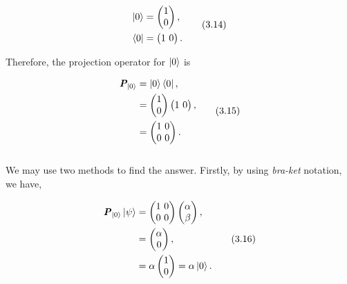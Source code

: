 \documentclass{article}
\begin{document}
\begin{align} \label{eq 3.14}
    \begin{split}
        \ket{0} &= \begin{pmatrix}
            1 \\ 0
        \end{pmatrix},\\
        \bra{0} &= \begin{pmatrix}
            1 \ 0\\
        \end{pmatrix}.
    \end{split} \tag{3.14}
\end{align}

Therefore, the projection operator for $\ket{0}$ is

\begin{align} \label{eq 3.15}
    \begin{split}
        \textit{\textbf{P}}_{\ket{0}}&= \ket{0}\bra{0},\\
        &=\begin{pmatrix}
            1 \\0
        \end{pmatrix}
        \begin{pmatrix}
            1 \ 0
        \end{pmatrix},\\
        &= \begin{pmatrix}
            1 \ 0\\ 0 \ 0
        \end{pmatrix}.
    \end{split} \tag{3.15}
\end{align}\\
We may use two methods to find the answer. Firstly, by using \textit{bra-ket} notation, we have,

\begin{align} \label{eq 3.16}
    \begin{split}
        \textbf{\textit{P}}_{\ket{0}} \ket{\psi} &=\begin{pmatrix}
            1 \ 0 \\ 0 \ 0
        \end{pmatrix}
        \begin{pmatrix}
            \alpha \\ \beta
        \end{pmatrix},\\
        &=\begin{pmatrix}
            \alpha \\ 0
        \end{pmatrix},\\
        &= \alpha \begin{pmatrix}
            1 \\ 0
        \end{pmatrix} = \alpha \ket{0}.
    \end{split} \tag{3.16}
\end{align}
\end{document}
